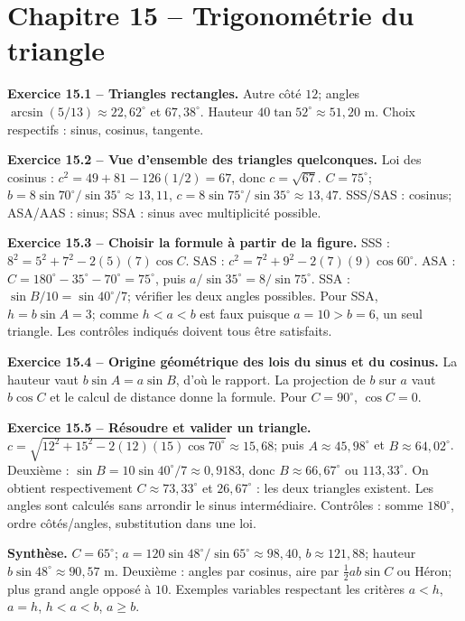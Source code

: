 \chapter*{Chapitre 15 -- Trigonométrie du triangle}
\begin{answerbox}
\textbf{Exercice 15.1 -- Triangles rectangles.} Autre côté $12$; angles $\arcsin(5/13)\approx22{,}62^\circ$ et $67{,}38^\circ$. Hauteur $40\tan52^\circ\approx51{,}20$ m. Choix respectifs : sinus, cosinus, tangente.\par
\textbf{Exercice 15.2 -- Vue d'ensemble des triangles quelconques.} Loi des cosinus : $c^2=49+81-126(1/2)=67$, donc $c=\sqrt{67}$. $C=75^\circ$; $b=8\sin70^\circ/\sin35^\circ\approx13{,}11$, $c=8\sin75^\circ/\sin35^\circ\approx13{,}47$. SSS/SAS : cosinus; ASA/AAS : sinus; SSA : sinus avec multiplicité possible.\par
\textbf{Exercice 15.3 -- Choisir la formule à partir de la figure.} SSS : $8^2=5^2+7^2-2(5)(7)\cos C$. SAS : $c^2=7^2+9^2-2(7)(9)\cos60^\circ$. ASA : $C=180^\circ-35^\circ-70^\circ=75^\circ$, puis $a/\sin35^\circ=8/\sin75^\circ$. SSA : $\sin B/10=\sin40^\circ/7$; vérifier les deux angles possibles. Pour SSA, $h=b\sin A=3$; comme $h<a<b$ est faux puisque $a=10>b=6$, un seul triangle. Les contrôles indiqués doivent tous être satisfaits.\par
\textbf{Exercice 15.4 -- Origine géométrique des lois du sinus et du cosinus.} La hauteur vaut $b\sin A=a\sin B$, d'où le rapport. La projection de $b$ sur $a$ vaut $b\cos C$ et le calcul de distance donne la formule. Pour $C=90^\circ$, $\cos C=0$.\par
\textbf{Exercice 15.5 -- Résoudre et valider un triangle.} $c=\sqrt{12^2+15^2-2(12)(15)\cos70^\circ}\approx15{,}68$; puis $A\approx45{,}98^\circ$ et $B\approx64{,}02^\circ$. Deuxième : $\sin B=10\sin40^\circ/7\approx0{,}9183$, donc $B\approx66{,}67^\circ$ ou $113{,}33^\circ$. On obtient respectivement $C\approx73{,}33^\circ$ et $26{,}67^\circ$ : les deux triangles existent. Les angles sont calculés sans arrondir le sinus intermédiaire. Contrôles : somme $180^\circ$, ordre côtés/angles, substitution dans une loi.\par
\medskip\textbf{Synthèse.} $C=65^\circ$; $a=120\sin48^\circ/\sin65^\circ\approx98{,}40$, $b\approx121{,}88$; hauteur $b\sin48^\circ\approx90{,}57$ m. Deuxième : angles par cosinus, aire par $\frac12ab\sin C$ ou Héron; plus grand angle opposé à $10$. Exemples variables respectant les critères $a<h$, $a=h$, $h<a<b$, $a\ge b$.
\end{answerbox}
